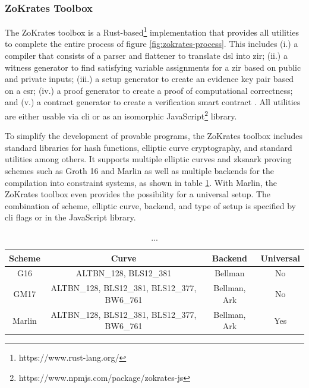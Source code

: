
\subsubsection{ZoKrates Toolbox}
\label{subsubsec:toolbox}

The ZoKrates toolbox is a Rust-based\footnote{https://www.rust-lang.org/} implementation that provides all utilities to complete the entire process of figure \ref{fig:zokrates-process}. This includes (i.) a compiler that consists of a parser and flattener to translate \acrshort{dsl} into \acrshort{zir}; (ii.) a witness generator to find satisfying variable assignments for a \acrshort{zir} based on public and private inputs; (iii.) a setup generator to create an evidence key pair based on a \acrshort{csr}; (iv.) a proof generator to create a proof of computational correctness; and (v.) a contract generator to create a verification smart contract \cite{eberhardtZoKratesScalablePrivacyPreserving2018a}. All utilities are either usable via \acrfull{cli} or as an isomorphic JavaScript\footnote{https://www.npmjs.com/package/zokrates-js} library.

To simplify the development of provable programs, the ZoKrates toolbox includes standard libraries for hash functions, elliptic curve cryptography, and standard utilities among others. It supports multiple elliptic curves and \acrshort{zksnark} proving schemes such as Groth 16 and Marlin as well as multiple backends for the compilation into constraint systems, as shown in table \ref{tab:zokrates-backend}. With Marlin, the ZoKrates toolbox even provides the possibility for a universal setup. The combination of scheme, elliptic curve, backend, and type of setup is specified by \acrshort{cli} flags or in the JavaScript library.

\begin{table}[H]
  \small
  \centering
    \begin{tabular}{cccc}
    \toprule
    \textbf{Scheme} & \textbf{Curve} & \textbf{Backend} & \textbf{Universal} \\
    \midrule
    G16 \cite{grothSizePairingBasedNoninteractive2016} & ALTBN\_128, BLS12\_381 & Bellman & No \\
    GM17 \cite{grothSnarkySignaturesMinimal2017} & ALTBN\_128, BLS12\_381, BLS12\_377, BW6\_761 & Bellman, Ark & No \\
    Marlin \cite{chiesaMarlinPreprocessingZkSNARKs2020} & ALTBN\_128, BLS12\_381, BLS12\_377, BW6\_761 & Bellman, Ark & Yes \\
    \bottomrule
    \end{tabular}%
  \caption{...}
  \label{tab:zokrates-backend}%
\end{table}%
